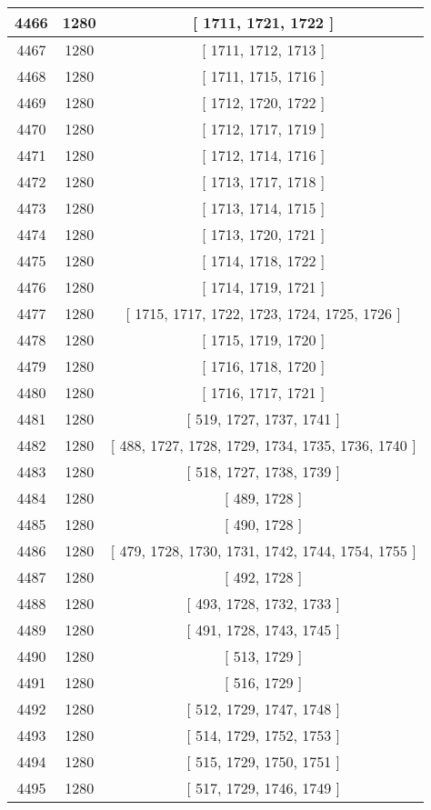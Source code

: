 \begin{center}
\begin{longtable}[H]{|| c c c ||}
\hline
4466 & 1280 & [ 1711, 1721, 1722 ] \\ 
\hline
4467 & 1280 & [ 1711, 1712, 1713 ] \\ 
\hline
4468 & 1280 & [ 1711, 1715, 1716 ] \\ 
\hline
4469 & 1280 & [ 1712, 1720, 1722 ] \\ 
\hline
4470 & 1280 & [ 1712, 1717, 1719 ] \\ 
\hline
4471 & 1280 & [ 1712, 1714, 1716 ] \\ 
\hline
4472 & 1280 & [ 1713, 1717, 1718 ] \\ 
\hline
4473 & 1280 & [ 1713, 1714, 1715 ] \\ 
\hline
4474 & 1280 & [ 1713, 1720, 1721 ] \\ 
\hline
4475 & 1280 & [ 1714, 1718, 1722 ] \\ 
\hline
4476 & 1280 & [ 1714, 1719, 1721 ] \\ 
\hline
4477 & 1280 & [ 1715, 1717, 1722, 1723, 1724, 1725, 1726 ] \\ 
\hline
4478 & 1280 & [ 1715, 1719, 1720 ] \\ 
\hline
4479 & 1280 & [ 1716, 1718, 1720 ] \\ 
\hline
4480 & 1280 & [ 1716, 1717, 1721 ] \\ 
\hline
4481 & 1280 & [ 519, 1727, 1737, 1741 ] \\ 
\hline
4482 & 1280 & [ 488, 1727, 1728, 1729, 1734, 1735, 1736, 1740 ] \\ 
\hline
4483 & 1280 & [ 518, 1727, 1738, 1739 ] \\ 
\hline
4484 & 1280 & [ 489, 1728 ] \\ 
\hline
4485 & 1280 & [ 490, 1728 ] \\ 
\hline
4486 & 1280 & [ 479, 1728, 1730, 1731, 1742, 1744, 1754, 1755 ] \\ 
\hline
4487 & 1280 & [ 492, 1728 ] \\ 
\hline
4488 & 1280 & [ 493, 1728, 1732, 1733 ] \\ 
\hline
4489 & 1280 & [ 491, 1728, 1743, 1745 ] \\ 
\hline
4490 & 1280 & [ 513, 1729 ] \\ 
\hline
4491 & 1280 & [ 516, 1729 ] \\ 
\hline
4492 & 1280 & [ 512, 1729, 1747, 1748 ] \\ 
\hline
4493 & 1280 & [ 514, 1729, 1752, 1753 ] \\ 
\hline
4494 & 1280 & [ 515, 1729, 1750, 1751 ] \\ 
\hline
4495 & 1280 & [ 517, 1729, 1746, 1749 ] \\ 

\end{longtable}
\end{center}
